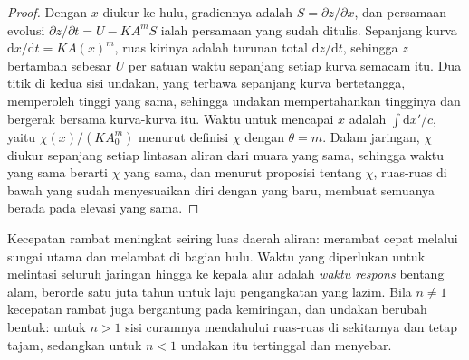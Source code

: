 \begin{proof}
Dengan $x$ diukur ke hulu, gradiennya adalah $S = \partial z/\partial x$, dan
persamaan evolusi $\partial z/\partial t = U - K A^m S$ ialah persamaan
yang sudah ditulis. Sepanjang kurva $\mathrm{d}x/\mathrm{d}t = K A(x)^m$, ruas kirinya
adalah turunan total $\mathrm{d}z/\mathrm{d}t$, sehingga $z$ bertambah sebesar $U$ per
satuan waktu sepanjang setiap kurva semacam itu. Dua titik di kedua sisi undakan,
yang terbawa sepanjang kurva bertetangga, memperoleh tinggi yang sama, sehingga undakan
mempertahankan tingginya dan bergerak bersama kurva-kurva itu. Waktu untuk mencapai $x$ adalah
$\int \mathrm{d}x'/c$, yaitu $\chi(x)/(K A_0^m)$ menurut definisi
$\chi$ dengan $\theta = m$. Dalam jaringan, $\chi$ diukur sepanjang setiap
lintasan aliran dari muara yang sama, sehingga waktu yang sama berarti $\chi$ yang sama, dan menurut
proposisi tentang $\chi$, ruas-ruas di bawah  yang sudah
menyesuaikan diri dengan  yang baru, membuat semuanya berada pada elevasi yang sama.
\end{proof}

Kecepatan rambat meningkat seiring luas daerah aliran:  merambat cepat melalui
sungai utama dan melambat di bagian hulu. Waktu yang diperlukan untuk melintasi seluruh
jaringan hingga ke kepala alur adalah \emph{waktu respons} bentang alam,
berorde satu juta tahun untuk laju pengangkatan yang lazim. Bila $n \ne 1$
kecepatan rambat juga bergantung pada kemiringan, dan undakan berubah bentuk: untuk $n >
1$ sisi curamnya mendahului ruas-ruas di sekitarnya dan tetap tajam, sedangkan untuk $n <
1$ undakan itu tertinggal dan menyebar.

